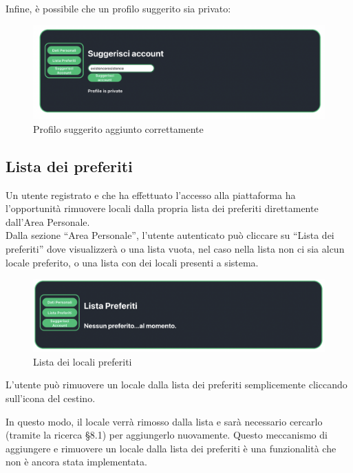 Infine, è possibile che un profilo suggerito sia privato:

\begin{figure}[H]
\centering
\includegraphics[scale=0.4]{./images/AreaPersonale/ProfiloPrivato.png} 
\caption{Profilo suggerito aggiunto correttamente}
\end{figure}

\subsection{Lista dei preferiti}

Un utente registrato e che ha effettuato l’accesso alla piattaforma ha l’opportunità rimuovere locali dalla propria lista dei preferiti direttamente dall'Area Personale. \\

Dalla sezione “Area Personale”, l’utente autenticato può cliccare su “Lista dei preferiti” dove visualizzerà o una lista vuota, nel caso nella lista non ci sia alcun locale preferito, o una lista con dei locali presenti a sistema.

\begin{figure}[H]
\centering
\includegraphics[scale=0.4]{./images/AreaPersonale/ListaPreferiti.png} 
\caption{Lista dei locali preferiti}
\end{figure}

L’utente può rimuovere un locale dalla lista dei preferiti semplicemente cliccando sull’icona del cestino.

In questo modo, il locale verrà rimosso dalla lista e sarà necessario cercarlo (tramite la ricerca \S{8.1}) per aggiungerlo nuovamente. Questo meccanismo di aggiungere e rimuovere un locale dalla lista dei preferiti è una funzionalità che non è ancora stata implementata.
